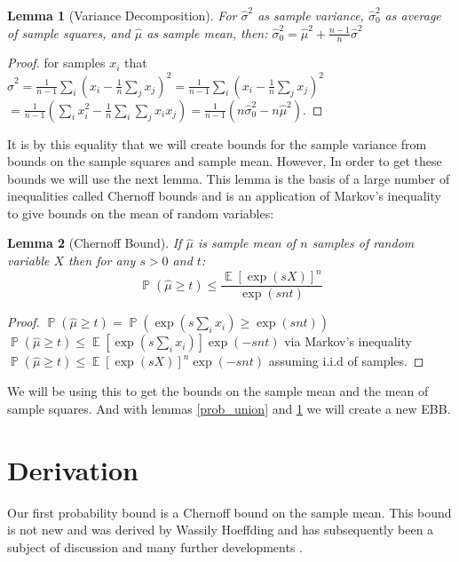 \documentclass[aap,preprint]{imsart}
\newtheorem{lemma}{Lemma}
\DeclareMathOperator{\E}{\mathbb{E}}
\DeclareMathOperator{\p}{\mathbb{P}}
\begin{document}
\begin{lemma}[Variance Decomposition]\label{variance1}
For $\hat{\sigma}^2$ as sample variance, $\hat{\sigma}_0^2$ as average of sample squares, and $\hat{\mu}$ as sample mean, then:
$ \hat{\sigma}_0^2 = \hat{\mu}^2+\frac{n-1}{n}\hat{\sigma}^2 $
\end{lemma}
\begin{proof}
for samples $x_i$ that\\
$\hat{\sigma}^2=\frac{1}{n-1}\sum_i(x_i-\frac{1}{n}\sum_jx_j)^2 = \frac{1}{n-1}\sum_i(x_i-\frac{1}{n}\sum_jx_j)^2$\\
$=\frac{1}{n-1}(\sum_ix_i^2-\frac{1}{n}\sum_i\sum_jx_ix_j) = \frac{1}{n-1}(n\hat{\sigma}_0^2-n\hat{\mu}^2)$.
\end{proof}

It is by this equality that we will create bounds for the sample variance from bounds on the sample squares and sample mean.
However, In order to get these bounds we will use the next lemma. This lemma is the basis of a large number of inequalities called Chernoff bounds and is an application of Markov's inequality to give bounds on the mean of random variables\cite{hoeffding2}:

\begin{lemma}[Chernoff Bound]\label{chernoff1}
If $\hat{\mu}$ is sample mean of $n$ samples of random variable $X$ then for any $s>0$ and $t$:
$$ \textstyle\p(\hat{\mu}\ge t)\le\frac{\E\left[\exp(sX)\right]^n}{\exp(snt)} $$
\end{lemma}
\begin{proof}
$\p(\hat{\mu}\ge t) = \p(\exp(s\sum_ix_i)\ge \exp(snt))$\\
$\p(\hat{\mu}\ge t) \le \E[\exp(s\sum_ix_i)]\exp(-snt)$ via Markov's inequality \\ 
$\p(\hat{\mu}\ge t) \le \E\left[\exp(sX)\right]^n\exp(-snt)$ assuming i.i.d of samples.
\end{proof}

We will be using this to get the bounds on the sample mean and the mean of sample squares.
And with lemmas \ref{prob_union} and \ref{variance1} we will create a new EBB.

\section{Derivation}\label{derivation}

Our first probability bound is a Chernoff bound on the sample mean. This bound is not new and was derived by Wassily Hoeffding \cite{hoeffding1} and has subsequently been a subject of discussion and many further developments \cite{hoeffding2,Bentkus08boundsfor,Pinelis2014,zbMATH00812598}.
\end{document}
